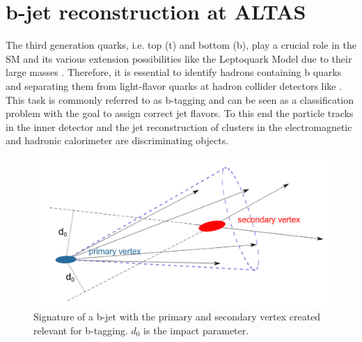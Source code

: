 \section{b-jet reconstruction at ALTAS}\label{btagging}
The third generation quarks, i.e. top (t) and bottom (b), play a crucial role in the SM and its various extension possibilities like the Leptoquark Model due to their large masses \cite{Hansson}. Therefore, it is essential to identify hadrons containing b quarks and separating them from light-flavor quarks at hadron collider detectors like {\ATLAS}. This task is commonly referred to as b-tagging and can be seen as a classification problem with the goal to assign correct jet flavors. To this end the particle tracks in the inner detector and the jet reconstruction of clusters in the electromagnetic and hadronic calorimeter are discriminating objects. \cite{Paganini}\par
%
\begin{figure}[htbp]                                 
 \begin{center}                                       
  \includegraphics[width=0.55\linewidth]{figures/btagged.pdf} 
   \caption[Tracks in a b-jet.]{Signature of a b-jet with the primary and secondary vertex created relevant for b-tagging. $d_0$ is the impact parameter. \cite{Hansson}}
  \label{btagged}                                    
 \end{center}
\end{figure}
%
